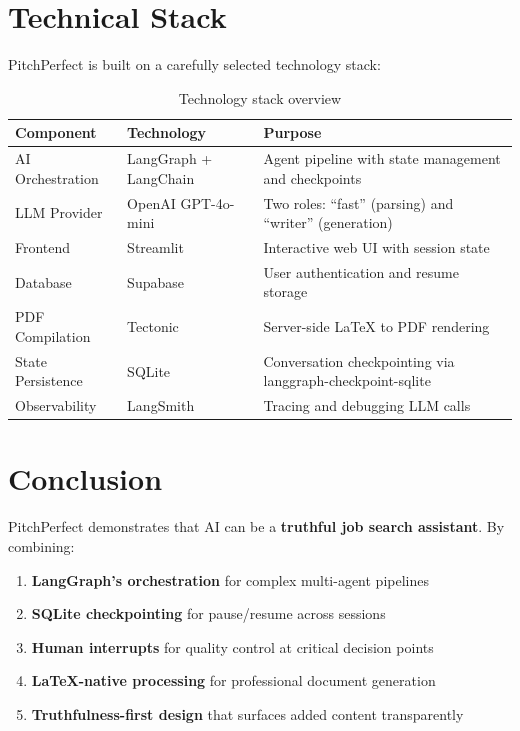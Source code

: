 \documentclass[12pt, a4paper]{article}
\begin{document}
\newpage

\section{Technical Stack}

PitchPerfect is built on a carefully selected technology stack:

\begin{table}[h]
\centering
\begin{tabular}{|l|l|p{6cm}|}
\hline
\textbf{Component} & \textbf{Technology} & \textbf{Purpose} \\
\hline
AI Orchestration & LangGraph + LangChain & Agent pipeline with state management and checkpoints \\
\hline
LLM Provider & OpenAI GPT-4o-mini & Two roles: ``fast'' (parsing) and ``writer'' (generation) \\
\hline
Frontend & Streamlit & Interactive web UI with session state \\
\hline
Database & Supabase & User authentication and resume storage \\
\hline
PDF Compilation & Tectonic & Server-side LaTeX to PDF rendering \\
\hline
State Persistence & SQLite & Conversation checkpointing via langgraph-checkpoint-sqlite \\
\hline
Observability & LangSmith & Tracing and debugging LLM calls \\
\hline
\end{tabular}
\caption{Technology stack overview}
\end{table}

\newpage

\section{Conclusion}

PitchPerfect demonstrates that AI can be a \textbf{truthful job search assistant}. By combining:

\begin{enumerate}
    \item \textbf{LangGraph's orchestration} for complex multi-agent pipelines
    \item \textbf{SQLite checkpointing} for pause/resume across sessions
    \item \textbf{Human interrupts} for quality control at critical decision points
    \item \textbf{LaTeX-native processing} for professional document generation
    \item \textbf{Truthfulness-first design} that surfaces added content transparently
\end{enumerate}
\end{document}

